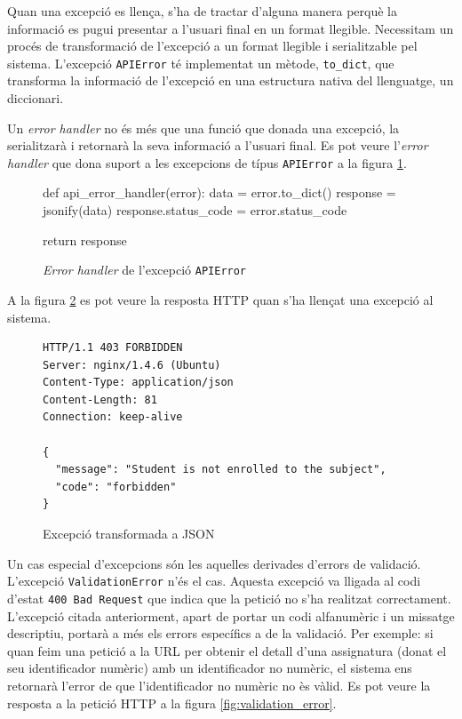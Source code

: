 Quan una excepció es llença, s'ha de tractar d'alguna manera perquè la informació es pugui presentar a l'usuari final en un format llegible. Necessitam un procés de transformació de l'excepció a un format llegible i serialitzable pel sistema. L'excepció \texttt{APIError} té implementat un mètode, \texttt{to\_dict}, que transforma la informació de l'excepció en una estructura nativa del llenguatge, un diccionari.

Un \emph{error handler} no és més que una funció que donada una excepció, la serialitzarà i retornarà la seva informació a l'usuari final. Es pot veure l'\emph{error handler} que dona suport a les excepcions de típus \texttt{APIError} a la figura \ref{fig:error_handler}.\\

\begin{figure}[h!]
	\begin{python}
def api_error_handler(error):
	data = error.to_dict()
	response = jsonify(data)
	response.status_code = error.status_code
	
	return response
	\end{python}
	\caption{\emph{Error handler} de l'excepció \texttt{APIError}}
	\label{fig:error_handler}

\end{figure}

A la figura \ref{fig:excepcio_json} es pot veure la resposta \ac{HTTP} quan s'ha llençat una excepció al sistema.

\begin{figure}[h!]
	\begin{verbatim}
HTTP/1.1 403 FORBIDDEN
Server: nginx/1.4.6 (Ubuntu)
Content-Type: application/json
Content-Length: 81
Connection: keep-alive

{
  "message": "Student is not enrolled to the subject", 
  "code": "forbidden"
}
	\end{verbatim}
	\caption{Excepció transformada a \ac{JSON}}
	\label{fig:excepcio_json}
\end{figure}

Un cas especial d'excepcions són les aquelles derivades d'errors de validació. L'excepció \texttt{ValidationError} n'és el cas. Aquesta excepció va lligada al codi d'estat \texttt{400 Bad Request} que indica que la petició no s'ha realitzat correctament.\\

L'excepció citada anteriorment, apart de portar un codi alfanumèric i un missatge descriptiu, portarà a més els errors específics a de la validació. Per exemple: si quan feim una petició a la \ac{URL} per obtenir el detall d'una assignatura (donat el seu identificador numèric) amb un identificador no numèric, el sistema ens retornarà l'error de que l'identificador no numèric no ès vàlid. Es pot veure la resposta a la petició \ac{HTTP} a la figura \ref{fig:validation_error}.\\

